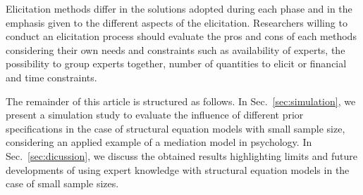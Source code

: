 \documentclass[graybox]{svmult}
\begin{document}
Elicitation methods differ in the solutions adopted during each phase and in the emphasis given to the different aspects of the elicitation. Researchers willing to conduct an elicitation process should evaluate the pros and cons of each methods considering their own needs and constraints such as availability of experts, the possibility to group experts together, number of quantities to elicit or financial and time constraints.

The remainder of this article is structured as follows. In Sec.~\ref{sec:simulation}, we present a simulation study to evaluate the influence of different prior specifications in the case of structural equation models with small sample size, considering an applied example of a mediation model in psychology. In Sec.~\ref{sec:dicussion}, we discuss the obtained results highlighting limits and future developments of using expert knowledge with structural equation models in the case of  small sample sizes.


%
\end{document}
